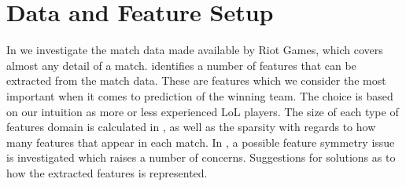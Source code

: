 \section{Data and Feature Setup}\label{sec:features}
In  we investigate the match data made available by Riot Games, which covers almost any detail of a match.
 identifies a number of features that can be extracted from the match data. These are features which we consider the most important when it comes to prediction of the winning team. The choice is based on our intuition as more or less experienced LoL players. The size of each type of features domain is calculated in , as well as the sparsity with regards to how many features that appear in each match.
In , a possible feature symmetry issue is investigated which raises a number of concerns. Suggestions for solutions as to how the extracted features is represented. 

